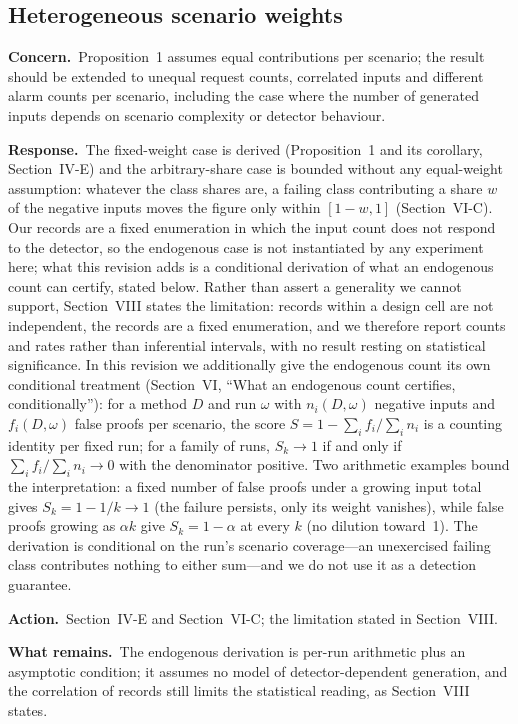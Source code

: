 \documentclass[10pt,letterpaper]{article}
\newcommand{\Concern}[1]{\par\smallskip\noindent\textbf{Concern.}\ #1\par}
\newcommand{\Response}[1]{\par\smallskip\noindent\textbf{Response.}\ #1\par}
\newcommand{\Action}[1]{\par\smallskip\noindent\textbf{Action.}\ #1\par}
\newcommand{\Remains}[1]{\par\smallskip\noindent\textbf{What remains.}\ #1\par}
\begin{document}
\subsection{Heterogeneous scenario weights}
\Concern{Proposition~1 assumes equal contributions per scenario; the result
should be extended to unequal request counts, correlated inputs and different
alarm counts per scenario, including the case where the number of generated
inputs depends on scenario complexity or detector behaviour.}
\Response{The fixed-weight case is derived (Proposition~1 and its corollary,
Section~IV-E) and the arbitrary-share case is bounded without any equal-weight
assumption: whatever the class shares are, a failing class contributing a share
$w$ of the negative inputs moves the figure only within $[1-w,1]$
(Section~VI-C). Our records are a fixed enumeration in which the input count
does not respond to the detector, so the endogenous case is not instantiated by
any experiment here; what this revision adds is a conditional derivation of
what an endogenous count can certify, stated below. Rather than assert a
generality we
cannot support, Section~VIII states the limitation: records within a design cell
are not independent, the records are a fixed enumeration, and we therefore report
counts and rates rather than inferential intervals, with no result resting on
statistical significance. In this revision we additionally give the endogenous
count its own conditional treatment (Section~VI, ``What an endogenous count
certifies, conditionally''): for a method $D$ and run $\omega$ with
$n_i(D,\omega)$ negative inputs and $f_i(D,\omega)$ false proofs per scenario,
the score $S=1-\sum_i f_i/\sum_i n_i$ is a counting identity per fixed run; for
a family of runs, $S_k\to 1$ if and only if
$\sum_i f_i/\sum_i n_i\to 0$ with the denominator positive. Two arithmetic
examples bound the interpretation: a fixed number of false proofs under a
growing input total gives $S_k=1-1/k\to 1$ (the failure persists, only its
weight vanishes), while false proofs growing as $\alpha k$ give $S_k=1-\alpha$
at every $k$ (no dilution toward~1). The derivation is conditional on the
run's scenario coverage---an unexercised failing class contributes nothing to
either sum---and we do not use it as a detection guarantee.}
\Action{Section~IV-E and Section~VI-C; the limitation stated in Section~VIII.}
\Remains{The endogenous derivation is per-run arithmetic plus an asymptotic
condition; it assumes no model of detector-dependent generation, and the
correlation of records still limits the statistical reading, as Section~VIII
states.}
\end{document}
